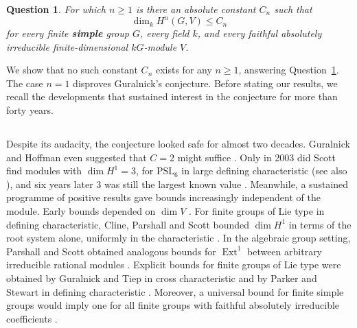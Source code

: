 \documentclass[11pt,a4paper,reqno]{amsart}
\numberwithin{equation}{section}
\newtheorem{question}{Question}
\theoremstyle{definition}
\theoremstyle{remark}
\theoremstyle{plain}
\begin{document}
\begin{question}\cite[Question~12.1]{GKKL2007} \label{question:higher-degree-bound}
  For which $n\geq 1$    is there an absolute constant $C_n$ such that
\[
\dim_k H^n(G,V)\le C_n
\]
for every finite \textbf{simple} group $G$, every field $k$, and every faithful
absolutely irreducible finite-dimensional $kG$-module $V$.
\end{question}



We show that no such constant $C_n$ exists for any $n\geq1$, answering
Question~\ref{question:higher-degree-bound}. The case $n=1$ disproves
Guralnick's conjecture. Before stating our results, we recall the
developments that sustained interest in the conjecture for more than
forty years.
 
\subsection{}
 
 
Despite its audacity, the conjecture looked safe for almost two decades.
Guralnick and Hoffman even suggested that $C=2$ might suffice
\cite[Conjecture 2]{GuralnickHoffman}. Only in 2003 did Scott find modules with
$\dim H^1=3$, for $\mathrm{PSL}_6$ in large defining characteristic
\cite{Scott2003} (see also \cite{BrayWilson}), and six years later $3$ was still the largest
known value \cite[Introduction]{CPS09}. 
%
Meanwhile, a sustained programme of positive results gave bounds
increasingly independent of the module. Early bounds depended on
$\dim V$ \cite{AschbacherGuralnick,GuralnickHoffman}.
For finite groups of Lie type in defining characteristic, Cline,
Parshall and Scott bounded $\dim H^1$ in terms of the root system
alone, uniformly in the characteristic \cite{CPS09}.
In the algebraic group setting, Parshall and Scott obtained
analogous bounds for $\operatorname{Ext}^1$ between arbitrary
irreducible rational modules
\cite[Theorem~5.1]{PS-BoundingExt}.
Explicit bounds for finite groups of Lie type were obtained by
Guralnick and Tiep in cross characteristic \cite{GT11} and by
Parker and Stewart in defining characteristic \cite{PS14}.
Moreover, a universal bound for finite simple groups would imply
one for all finite groups with faithful absolutely irreducible
coefficients \cite[Lemma~5.2]{GKKL2007}.
\end{document}
